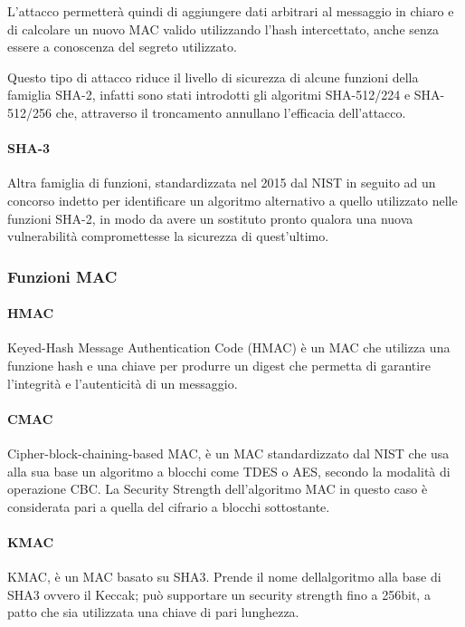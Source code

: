 L'attacco permetterà quindi di aggiungere dati arbitrari al messaggio in
chiaro e di calcolare un nuovo MAC valido utilizzando l'hash
intercettato, anche senza essere a conoscenza del segreto utilizzato.

Questo tipo di attacco riduce il livello di sicurezza di alcune funzioni
della famiglia SHA-2, infatti sono stati introdotti gli algoritmi
SHA-512/224 e SHA-512/256 che, attraverso il troncamento annullano
l'efficacia dell'attacco.

\paragraph{SHA-3}\label{sha-3}

Altra famiglia di funzioni, standardizzata nel 2015 dal NIST in seguito
ad un concorso indetto per identificare un algoritmo alternativo a
quello utilizzato nelle funzioni SHA-2, in modo da avere un sostituto
pronto qualora una nuova vulnerabilità compromettesse la sicurezza di
quest'ultimo.

\subsubsection{Funzioni MAC}\label{funzioni-mac}

\paragraph{HMAC}\label{hmac}

Keyed-Hash Message Authentication Code (HMAC) è un MAC che utilizza una
funzione hash e una chiave per produrre un digest che permetta di
garantire l'integrità e l'autenticità di un messaggio.

\paragraph{CMAC}\label{cmac}

Cipher-block-chaining-based MAC, è un MAC standardizzato dal NIST che
usa alla sua base un algoritmo a blocchi come TDES o AES, secondo la
modalità di operazione CBC. La Security Strength dell'algoritmo MAC in
questo caso è considerata pari a quella del cifrario a blocchi
sottostante.

\paragraph{KMAC}\label{kmac}

KMAC, è un MAC basato su SHA3. Prende il nome
dell\textquotesingle algoritmo alla base di SHA3 ovvero il Keccak; può
supportare un security strength fino a 256bit, a patto che sia
utilizzata una chiave di pari lunghezza.

